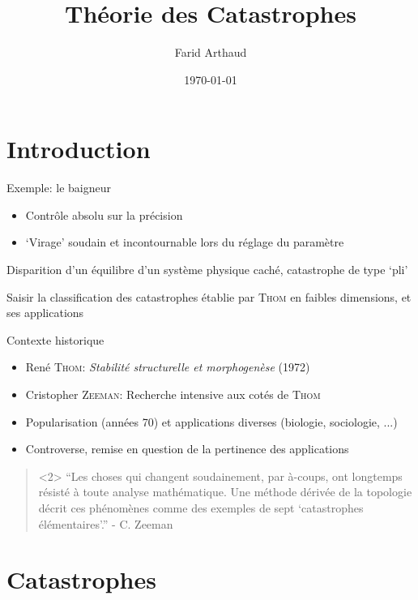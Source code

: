\documentclass[compress]{beamer}
\author{Farid Arthaud}
\title{Théorie des Catastrophes}
\date{\today}
\theoremstyle{definition}
\begin{document}
\frame{\titlepage}

\frame{\tableofcontents}

\section*{Introduction}
\begin{frame}{Exemple: le baigneur}
    \begin{itemize}[<+->]
        \item Contrôle absolu sur la précision
        \item `Virage' soudain et incontournable lors du réglage du paramètre
    \end{itemize}
    \begin{description}[<+->]
        \item[Explication:] Disparition d'un équilibre d'un système physique caché, catastrophe de type `pli'
        \item[Objectif:] Saisir la classification des catastrophes établie par \textsc{Thom} en faibles dimensions, et ses applications
    \end{description}
\end{frame}

\begin{frame}{Contexte historique}
    \begin{itemize}
        \item René \textsc{Thom}: \textit{Stabilité structurelle et morphogenèse} (1972)
        \item Cristopher \textsc{Zeeman}: Recherche intensive aux cotés de \textsc{Thom}
        \item Popularisation (années 70) et applications diverses (biologie, sociologie, ...)
        \item Controverse, remise en question de la pertinence des applications
    \end{itemize}
    \begin{quote}<2>
        ``Les choses qui changent soudainement, par à-coups, ont longtemps résisté à toute analyse mathématique.
        Une méthode dérivée de la topologie décrit ces phénomènes comme des exemples de sept `catastrophes élémentaires'.'' - C. Zeeman
    \end{quote}
\end{frame}

\section{Catastrophes}
\end{document}
